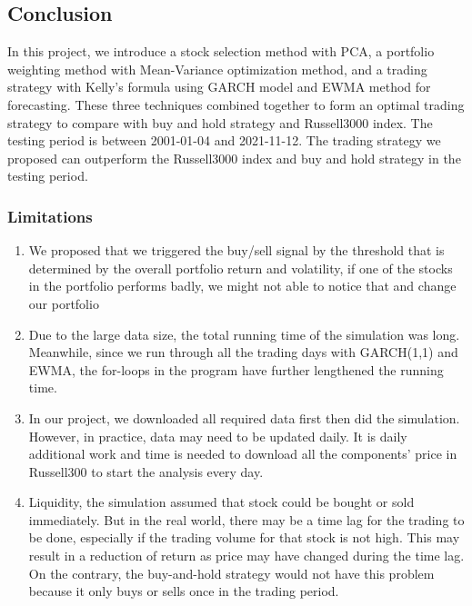 \documentclass[11pt,a4paper]{article}
\begin{document}
    
    \newpage
    \subsection{Conclusion}
    In this project, we introduce a stock selection method with PCA, a portfolio weighting method with Mean-Variance optimization method, and a trading strategy with Kelly's formula using GARCH model and EWMA method for forecasting. These three techniques combined together to form an optimal trading strategy to compare with buy and hold strategy and Russell3000 index. The testing period is between 2001-01-04 and 2021-11-12. The trading strategy we proposed can outperform the Russell3000 index and buy and hold strategy in the testing period.
    
    
    \subsubsection{Limitations}
    \begin{enumerate}
    \item We proposed that we triggered the buy/sell signal by the threshold that is determined by the overall portfolio return and volatility, if one of the stocks in the portfolio performs badly, we might not able to notice that and change our portfolio
    
    \item Due to the large data size, the total running time of the simulation was long. Meanwhile, since we run through all the trading days with GARCH(1,1) and EWMA,  the for-loops in the program have further lengthened the running time.
    
    \item In our project, we downloaded all required data first then did the simulation. However, in practice, data may need to be updated daily. It is daily additional work and time is needed to download all the components’ price in Russell300 to start the analysis every day.
    
    \item Liquidity,  the simulation assumed that stock could be bought or sold immediately. But in the real world, there may be a time lag for the trading to be done, especially if the trading volume for that stock is not high. This may result in a reduction of return as price may have changed during the time lag. On the contrary, the buy-and-hold strategy would not have this problem because it only buys or sells once in the trading period.
    \end{enumerate}
    
\end{document}
